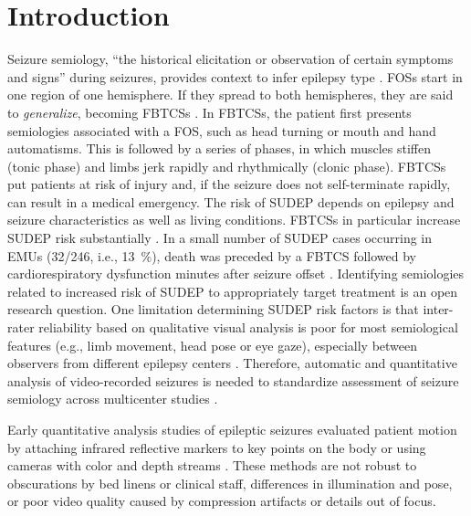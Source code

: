 \section{Introduction}



Seizure semiology, ``the historical elicitation or observation of certain symptoms and signs'' during seizures, provides context to infer epilepsy type \cite{fisher_operational_2017}.
\Acp{FOS} start in one region of one hemisphere.
If they spread to both hemispheres, they are said to \emph{generalize}, becoming \acp{FBTCS} \cite{fisher_operational_2017}.
In \acp{FBTCS}, the patient first presents semiologies associated with a \ac{FOS}, such as head turning or mouth and hand automatisms.
This is followed by a series of phases, in which muscles stiffen (tonic phase) and limbs jerk rapidly and rhythmically (clonic phase).
\Acp{FBTCS} put patients at risk of injury and, if the seizure does not self-terminate rapidly, can result in a medical emergency.
%
The risk of \ac{SUDEP} depends on epilepsy and seizure characteristics as well as living conditions.
\Acp{FBTCS} in particular increase \ac{SUDEP} risk substantially \cite{nashef_unifying_2012}.
In a small number of \ac{SUDEP} cases occurring in \acp{EMU} (32/246, i.e., 13~\%), death was preceded by a \ac{FBTCS} followed by cardiorespiratory dysfunction minutes after seizure offset \cite{ryvlin_incidence_2013}.
Identifying semiologies related to increased risk of \ac{SUDEP} to appropriately target treatment is an open research question.
One limitation determining \ac{SUDEP} risk factors is that inter-rater reliability based on qualitative visual analysis is poor for most semiological features (e.g., limb movement, head pose or eye gaze), especially between observers from different epilepsy centers \cite{tufenkjian_seizure_2012}.
Therefore, automatic and quantitative analysis of video-recorded seizures is needed to standardize assessment of seizure semiology across multicenter studies \cite{ahmedtaristizabal_automated_2017}.




Early quantitative analysis studies of epileptic seizures evaluated patient motion by attaching infrared reflective markers to key points on the body or using cameras with color and depth streams \cite{li_z_movement_2002,cunha_movement_2003,odwyer_lateralizing_2007,cunha_neurokinect_2016}.
These methods are not robust to obscurations by bed linens or clinical staff, differences in illumination and pose, or poor video quality caused by compression artifacts or details out of focus.

